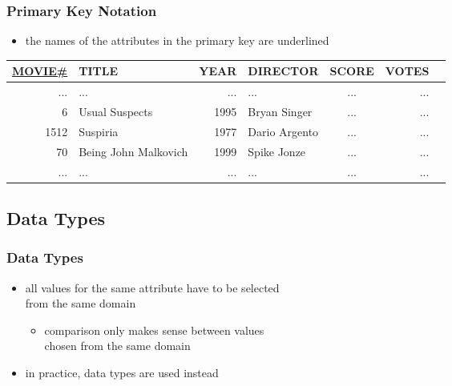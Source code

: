 \documentclass[dvipsnames]{beamer}
\theoremstyle{plain}
\begin{document}
\begin{frame}
  \frametitle{Primary Key Notation}

  \begin{itemize}
    \item the names of the attributes in the primary key are underlined
  \end{itemize}

  \begin{example}
    \begin{tiny}
    \begin{table}
      \begin{tabular}{|r|l|r|l|c|r|r|}\hline
\underline{MOVIE\#} & TITLE & YEAR & DIRECTOR      & SCORE & VOTES\\[2pt]\hline\hline
 ... & ...                  &  ... & ...           &   ... &   ...\\\hline
   6 & Usual Suspects       & 1995 & Bryan Singer  &   ... &   ...\\\hline
1512 & Suspiria             & 1977 & Dario Argento &   ... &   ...\\\hline
  70 & Being John Malkovich & 1999 & Spike Jonze   &   ... &   ...\\\hline
 ... & ...                  &  ... & ...           &   ... &   ...\\\hline
      \end{tabular}
    \end{table}
    \end{tiny}
  \end{example}
\end{frame}

\subsection{Data Types}

\begin{frame}
  \frametitle{Data Types}

  \begin{itemize}
    \item all values for the same attribute have to be selected\\
      from the same domain
    \begin{itemize}
      \item comparison only makes sense between values\\
        chosen from the same domain
    \end{itemize}

    \medskip
    \item in practice, data types are used instead
  \end{itemize}
\end{frame}
\end{document}
